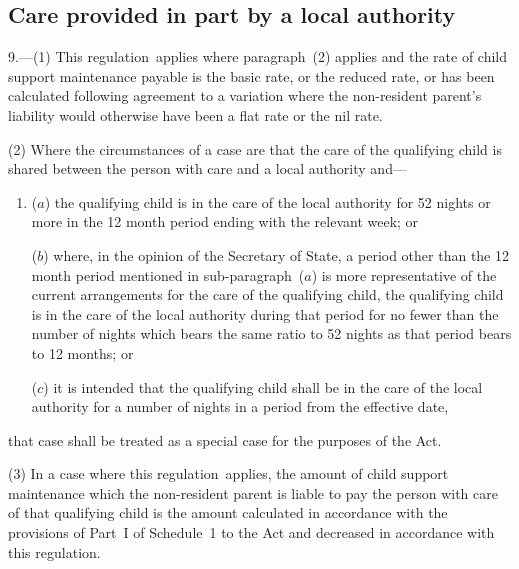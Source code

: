\documentclass[12pt,a4paper]{article}
\begin{document}

\subsection[9. Care provided in part by a local authority]{Care provided in part by a local authority}

9.---(1)  This regulation~applies where paragraph~(2) applies and the rate of child support maintenance payable is the basic rate, or the reduced rate, or has been calculated following agreement to a variation where the non-resident parent’s liability would otherwise have been a flat rate or the nil rate.

(2) Where the circumstances of a case are that the care of the qualifying child is shared between the person with care and a local authority and—
\begin{enumerate}\item[]
($a$) the qualifying child is in the care of the local authority for 52 nights or more in the 12 month period ending with the relevant week; or

($b$) where, in the opinion of the Secretary of State, a period other than the 12 month period mentioned in sub-paragraph~($a$)  is more representative of the current arrangements for the care of the qualifying child, the qualifying child is in the care of the local authority during that period for no fewer than the number of nights which bears the same ratio to 52 nights as that period bears to 12 months; or%

($c$) it is intended that the qualifying child shall be in the care of the local authority for a number of nights in a period from the effective date,
\end{enumerate}
that case shall be treated as a special case for the purposes of the Act.

(3) In a case where this regulation~applies, the amount of child support maintenance which the non-resident parent is liable to pay the person with care of that qualifying child is the amount calculated in accordance with the provisions of Part~I of Schedule~1 to the Act and decreased in accordance with this regulation.
\end{document}
